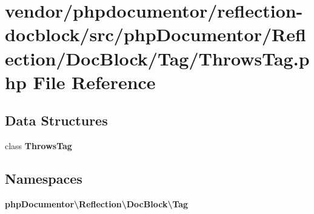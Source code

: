 \section{vendor/phpdocumentor/reflection-\/docblock/src/php\+Documentor/\+Reflection/\+Doc\+Block/\+Tag/\+Throws\+Tag.php File Reference}
\label{_throws_tag_8php}
\subsection*{Data Structures}
\begin{DoxyCompactItemize}
\item 
class {\bf Throws\+Tag}
\end{DoxyCompactItemize}
\subsection*{Namespaces}
\begin{DoxyCompactItemize}
\item 
 {\bf php\+Documentor\textbackslash{}\+Reflection\textbackslash{}\+Doc\+Block\textbackslash{}\+Tag}
\end{DoxyCompactItemize}
